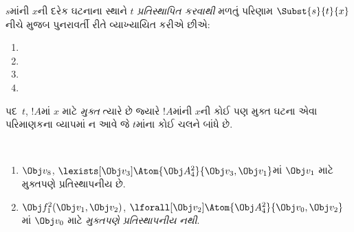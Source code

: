 \begin{defn}[પદમાં પ્રતિસ્થાપન]
$s$માંની $x$ની દરેક ઘટનાના સ્થાને $t$ \emph{પ્રતિસ્થાપિત કરવાથી}
મળતું પરિણામ $\Subst{s}{t}{x}$ નીચે મુજબ પુનરાવર્તી રીતે વ્યાખ્યાયિત
કરીએ છીએ:
\begin{enumerate}
\item {}

\item {}

\item {}

\item{}
\end{enumerate}
\end{defn}

\begin{defn}
પદ~$t$, $!A$માં $x$ માટે \emph{મુક્ત} ત્યારે છે જ્યારે
$!A$માંની $x$ની કોઈ પણ મુક્ત ઘટના એવા પરિમાણકના વ્યાપમાં ન આવે જે
$t$માંના કોઈ ચલને બાંધે છે.
\end{defn}

\begin{ex} ~
\begin{enumerate}
\item $\Obj v_8$, $\lexists[\Obj
  v_3]\Atom{\Obj A^2_4}{\Obj v_3,\Obj v_1}$માં $\Obj v_1$ માટે
  મુક્તપણે પ્રતિસ્થાપનીય છે.

\item $\Obj f^2_1(\Obj v_1, \Obj v_2)$,
  $\lforall[\Obj v_2]\Atom{\Obj A^2_4}{\Obj v_0,\Obj v_2}$માં
  $\Obj v_0$ માટે \emph{મુક્તપણે પ્રતિસ્થાપનીય નથી}.
\end{enumerate}
\end{ex}

